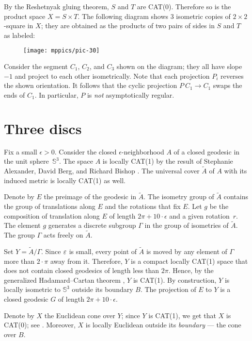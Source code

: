 \documentclass[a4paper,10pt]{article}
\begin{document}
By the Reshetnyak gluing theorem, $S$ and $T$ are CAT(0).
Therefore so is the product space $X=S\times T$.
The following diagram shows 3 isometric copies of $2{\times}2$-square in $X$; they are obtained as the products of two pairs of sides in $S$ and $T$ as labeled:
\begin{figure}[ht!]
\vskip0mm
\centering
\texttt{[image: mppics/pic-30]}
\end{figure}

Consider the segment $C_1$, $C_2$, and $C_3$ shown on the diagram;
they all have slope $-1$ and project to each other isometrically.
Note that each projection $P_i$ reverses the shown orientation.
It follows that the cyclic projection $P\:C_1\to C_1$ swaps the ends of $C_1$.
In particular, $P$ is \emph{not} asymptotically regular.


\section{Three discs}

Fix a small $\epsilon>0$.
Consider the closed 
$\epsilon$-neighborhood $A$ of a closed geodesic in the unit sphere~$\mathbb{S}^3$.
The space $A$ is locally CAT(1) by the result of Stephanie Alexander,  David Berg, and Richard Bishop \cite {ABB-1993}.
The universal cover $\tilde A$ of $A$ with its induced metric is locally CAT(1) as well. 

Denote by $E$ the preimage of the geodesic in $\tilde A$.
The isometry group of $\tilde A$ 
contains the group of translations along $E$ and 
the rotations that fix $E$.
Let $g$  be the composition of translation along $E$  of length $2\pi +10\cdot\epsilon$ and a given rotation~$r$.
The element $g$ generates a discrete subgroup $\Gamma$ in the group of isometries  of $\tilde A$.
The group $\Gamma$ acts freely on $\tilde A$.

Set $Y =\tilde A/\Gamma$.
Since $\varepsilon$ is small, every point of $\tilde A$ is moved by any element of $\Gamma$ more than $2\cdot\pi$ away from it.
Therefore, $Y$ is a compact locally CAT(1) space that does not contain closed geodesics of length less than $2\pi$.
Hence, by  the generalized Hadamard--Cartan theorem \cite{AKP}, $Y$ is CAT(1).
By construction, $Y$ is locally isometric to $\mathbb{S}^3$ outside its boundary $B$.
The projection of $E$ to $Y$ is a closed geodesic $G$ of length $2\pi +10\cdot\epsilon$.

Denote by $X$ the Euclidean cone over $Y$;
since $Y$ is CAT(1), we get that $X$ is CAT(0); see \cite{AKP}.
Moreover, $X$ is locally Euclidean outside its \emph{boundary} --- the cone over $B$.
\end{document}
